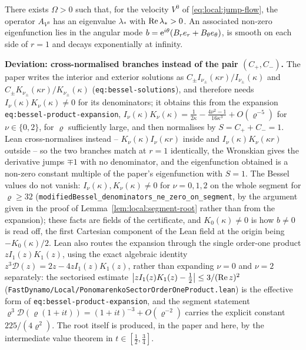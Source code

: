 \begin{lemma}
  \label{lem:jump-horizontal-mode}
  \leanok
  There exists $\Omega>0$ such that, for the velocity $V^0$ of
  \eqref{eq:local:jump-flow}, the operator $A_{V^0}$ has an eigenvalue $\lambda_*$ with
  $\operatorname{Re}\lambda_*>0$.  An associated non-zero eigenfunction lies in the angular mode
  $b=\mathrm{e}^{i\theta}(B_re_r+B_\theta e_\theta)$, is smooth on each side of $r=1$ and decays
  exponentially at infinity.
\end{lemma}

\textbf{Deviation: cross-normalised branches instead of the pair $(C_+,C_-)$.}  The
paper writes the interior and exterior solutions as
$C_\pm I_{\nu_\pm}(\kappa r)/I_{\nu_\pm}(\kappa)$ and
$C_\pm K_{\nu_\pm}(\kappa r)/K_{\nu_\pm}(\kappa)$ (\texttt{eq:bessel-solutions}), and
therefore needs $I_\nu(\kappa)K_\nu(\kappa)\neq0$ for its denominators; it obtains this
from the expansion \texttt{eq:bessel-product-expansion},
$I_\nu(\kappa)K_\nu(\kappa)=\tfrac1{2\kappa}-\tfrac{4\nu^2-1}{16\kappa^3}+O(\varrho^{-5})$
for $\nu\in\{0,2\}$, for $\varrho$ sufficiently large, and then normalises by
$S=C_++C_-=1$.  Lean cross-normalises instead -- $K_\nu(\kappa)I_\nu(\kappa r)$ inside and
$I_\nu(\kappa)K_\nu(\kappa r)$ outside -- so the two branches match at $r=1$ identically,
the Wronskian gives the derivative jumps $\mp1$ with no denominator, and the eigenfunction
obtained is a non-zero constant multiple of the paper's eigenfunction with $S=1$.  The
Bessel values do not vanish: $I_\nu(\kappa),K_\nu(\kappa)\neq0$
for $\nu=0,1,2$ on the whole segment for $\varrho\geq32$
(\texttt{modifiedBessel\_denominators\_ne\_zero\_on\_segment}, by the argument given in the
proof of Lemma~\ref{lem:local:segment-root} rather than from the expansion); these facts are
fields of the certificate, and $K_0(\kappa)\neq0$ is how $b\neq0$ is read off, the first
Cartesian component of the Lean field at the origin being $-K_0(\kappa)/2$.  Lean also
routes the expansion through the single order-one product $zI_1(z)K_1(z)$, using the exact
algebraic identity $z^3\mathcal D(z)=2z-4zI_1(z)K_1(z)$, rather than expanding $\nu=0$ and
$\nu=2$ separately: the sectorised estimate $\left\lvert zI_1(z)K_1(z)-\tfrac12\right\rvert\leq3/(\operatorname{Re} z)^2$
(\texttt{FastDynamo/\allowbreak Local/\allowbreak PonomarenkoSectorOrderOneProduct.lean}) is the effective form of
\texttt{eq:bessel-product-expansion}, and the segment statement
$\varrho^3\mathcal D(\varrho(1+it))=(1+it)^{-3}+O(\varrho^{-2})$ carries the explicit
constant $225/(4\varrho^2)$.  The root itself is produced, in the paper and here, by the
intermediate value theorem in $t\in[\tfrac12,\tfrac34]$.

